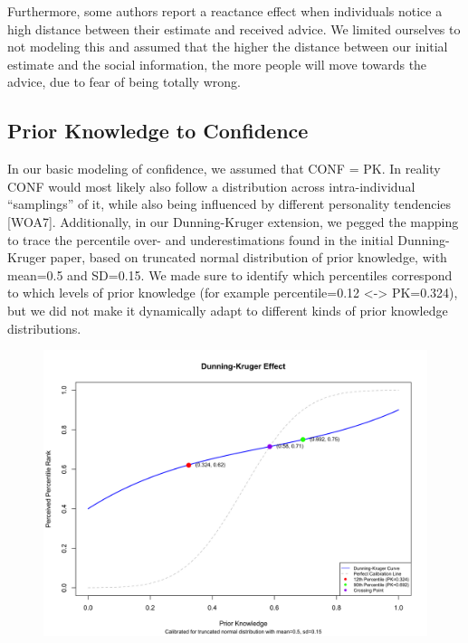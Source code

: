 \documentclass[
  man,floatsintext]{apa6}
\begin{document}
Furthermore, some authors report a reactance effect when individuals notice a high distance between their estimate and received advice. We limited ourselves to not modeling this and assumed that the higher the distance between our initial estimate and the social information, the more people will move towards the advice, due to fear of being totally wrong.

\hypertarget{prior-knowledge-to-confidence}{%
\subsection{Prior Knowledge to Confidence}\label{prior-knowledge-to-confidence}}

In our basic modeling of confidence, we assumed that CONF = PK. In reality CONF would most likely also follow a distribution across intra-individual ``samplings'' of it, while also being influenced by different personality tendencies {[}WOA7{]}. Additionally, in our Dunning-Kruger extension, we pegged the mapping to trace the percentile over- and underestimations found in the initial Dunning-Kruger paper, based on truncated normal distribution of prior knowledge, with mean=0.5 and SD=0.15. We made sure to identify which percentiles correspond to which levels of prior knowledge (for example percentile=0.12 \textless-\textgreater{} PK=0.324), but we did not make it dynamically adapt to different kinds of prior knowledge distributions.

\begin{figure}[H]
\includegraphics[width=5.59in]{photos/dk} \caption{ }\label{fig:unnamed-chunk-2}
\end{figure}
\end{document}
